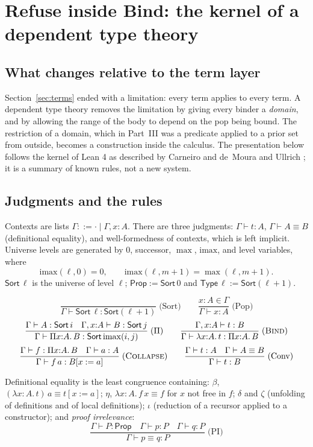 \documentclass[11pt]{article}
\newcommand{\subst}[3]{#1[#2:=#3]}
\newcommand{\Sort}{\mathsf{Sort}}
\newcommand{\Prop}{\mathsf{Prop}}
\newcommand{\Type}{\mathsf{Type}}
\newcommand{\imax}{\mathrm{imax}}
\theoremstyle{definition}
\theoremstyle{plain}
\theoremstyle{remark}
\begin{document}
\section{Refuse inside Bind: the kernel of a dependent type theory}\label{sec:kernel}

\subsection{What changes relative to the term layer}

Section~\ref{sec:terms} ended with a limitation: every term applies to every term. A dependent type theory removes the limitation by giving every binder a \emph{domain}, and by allowing the range of the body to depend on the pop being bound. The restriction of a domain, which in Part~III was a predicate applied to a prior set from outside, becomes a construction inside the calculus. The presentation below follows the kernel of Lean 4 as described by Carneiro \cite{Carneiro19} and de~Moura and Ullrich \cite{LeanCADE21}; it is a summary of known rules, not a new system.

\subsection{Judgments and the rules}

Contexts are lists $\Gamma::=\cdot\mid\Gamma,x{:}A$. There are three judgments: $\Gamma\vdash t:A$, $\Gamma\vdash A\equiv B$ (definitional equality), and well-formedness of contexts, which is left implicit. Universe levels are generated by $0$, successor, $\max$, $\imax$, and level variables, where
\[
\imax(\ell,0)=0,\qquad \imax(\ell,m+1)=\max(\ell,m+1).
\]
$\Sort\,\ell$ is the universe of level $\ell$; $\Prop:=\Sort\,0$ and $\Type\,\ell:=\Sort(\ell+1)$.

\[
\frac{}{\Gamma\vdash\Sort\,\ell:\Sort(\ell+1)}\;\text{(Sort)}\qquad
\frac{x{:}A\in\Gamma}{\Gamma\vdash x:A}\;\text{(Pop)}
\]
\[
\frac{\Gamma\vdash A:\Sort\,i\quad\Gamma,x{:}A\vdash B:\Sort\,j}{\Gamma\vdash\Pi x{:}A.\,B:\Sort\,\imax(i,j)}\;(\Pi)\qquad
\frac{\Gamma,x{:}A\vdash t:B}{\Gamma\vdash\lambda x{:}A.\,t:\Pi x{:}A.\,B}\;(\textsc{Bind})
\]
\[
\frac{\Gamma\vdash f:\Pi x{:}A.\,B\quad\Gamma\vdash a:A}{\Gamma\vdash f\,a:\subst{B}{x}{a}}\;(\textsc{Collapse})\qquad
\frac{\Gamma\vdash t:A\quad\Gamma\vdash A\equiv B}{\Gamma\vdash t:B}\;\text{(Conv)}
\]

Definitional equality is the least congruence containing: $\beta$, $(\lambda x{:}A.\,t)\,a\equiv\subst{t}{x}{a}$; $\eta$, $\lambda x{:}A.\,f\,x\equiv f$ for $x$ not free in $f$; $\delta$ and $\zeta$ (unfolding of definitions and of local definitions); $\iota$ (reduction of a recursor applied to a constructor); and \emph{proof irrelevance}:
\[
\frac{\Gamma\vdash P:\Prop\quad\Gamma\vdash p:P\quad\Gamma\vdash q:P}{\Gamma\vdash p\equiv q:P}\;\text{(PI)}
\]
\end{document}
